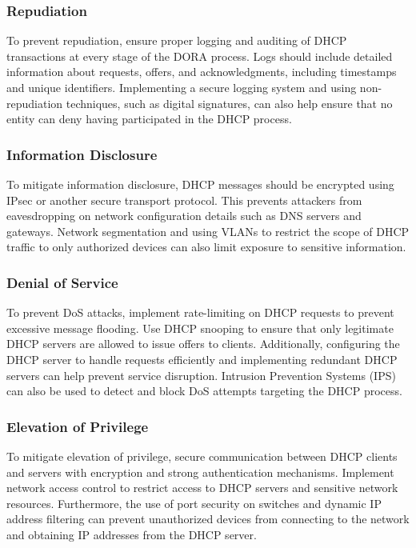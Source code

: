 \documentclass{article}
\begin{document}
\subsubsection{Repudiation}  
To prevent repudiation, ensure proper logging and auditing of DHCP transactions at every stage of the DORA process. Logs should include detailed information about requests, offers, and acknowledgments, including timestamps and unique identifiers. Implementing a secure logging system and using non-repudiation techniques, such as digital signatures, can also help ensure that no entity can deny having participated in the DHCP process.

\subsubsection{Information Disclosure}  
To mitigate information disclosure, DHCP messages should be encrypted using IPsec or another secure transport protocol. This prevents attackers from eavesdropping on network configuration details such as DNS servers and gateways. Network segmentation and using VLANs to restrict the scope of DHCP traffic to only authorized devices can also limit exposure to sensitive information.

\subsubsection{Denial of Service}  
To prevent DoS attacks, implement rate-limiting on DHCP requests to prevent excessive message flooding. Use DHCP snooping to ensure that only legitimate DHCP servers are allowed to issue offers to clients. Additionally, configuring the DHCP server to handle requests efficiently and implementing redundant DHCP servers can help prevent service disruption. Intrusion Prevention Systems (IPS) can also be used to detect and block DoS attempts targeting the DHCP process.

\subsubsection{Elevation of Privilege}  
To mitigate elevation of privilege, secure communication between DHCP clients and servers with encryption and strong authentication mechanisms. Implement network access control to restrict access to DHCP servers and sensitive network resources. Furthermore, the use of port security on switches and dynamic IP address filtering can prevent unauthorized devices from connecting to the network and obtaining IP addresses from the DHCP server.
\end{document}
